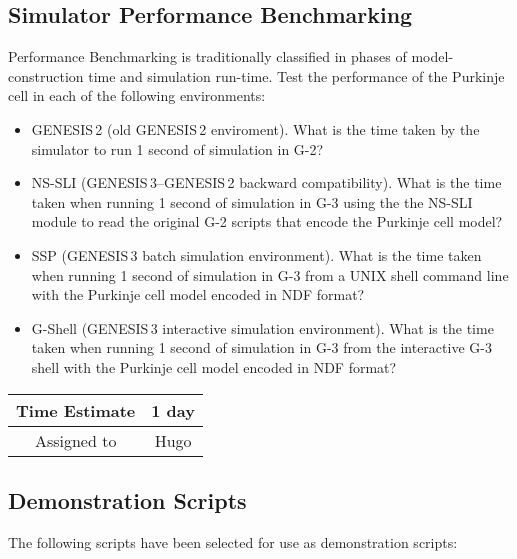 \documentclass[12pt]{article}
\begin{document}
\subsection{Simulator Performance Benchmarking}

Performance Benchmarking is traditionally classified in phases of
model-construction time and simulation run-time.  Test the performance
of the Purkinje cell in each of the following environments:

\begin{itemize}
\item GENESIS\,2 (old GENESIS\,2 enviroment).  What is the time taken
  by the simulator to run 1 second of simulation in G-2?
\item NS-SLI (GENESIS\,3--GENESIS\,2 backward compatibility).  What is
  the time taken when running 1 second of simulation in G-3 using the
  the NS-SLI module to read the original G-2 scripts that encode the
  Purkinje cell model?
\item SSP (GENESIS\,3 batch simulation environment).  What is the time
  taken when running 1 second of simulation in G-3 from a UNIX shell
  command line with the Purkinje cell model encoded in NDF format?
\item G-Shell (GENESIS\,3 interactive simulation environment).  What
  is the time taken when running 1 second of simulation in G-3 from
  the interactive G-3 shell with the Purkinje cell model encoded in
  NDF format?
\end{itemize}

\begin{center}
  \vspace{5mm}
  \centering
  \begin{tabular}{|c|c|}
    \hline
    Time Estimate
    & 1 day \\
    \hline
    Assigned to
    & Hugo \\
    \hline
  \end{tabular}
\end{center}


\subsection{Demonstration Scripts}

The following scripts have been selected for use as demonstration
scripts:
\end{document}
